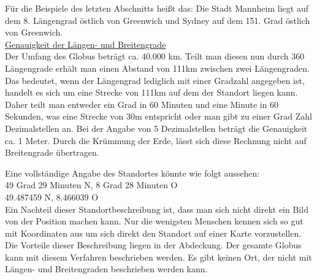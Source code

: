 Für die Beispiele des letzten Abschnitts heißt das: Die Stadt Mannheim liegt auf dem 8. Längengrad östlich von Greenwich und Sydney auf dem 151. Grad östlich von Greenwich.
\\\underline{Genauigkeit der Längen- und Breitengrade}
\\Der Umfang des Globus beträgt ca. 40.000 km. Teilt man diesen nun durch 360 Längengrade erhält man einen Abstand von 111km zwischen zwei Längengraden. Das bedeutet, wenn der Längengrad lediglich mit einer Gradzahl angegeben ist, handelt es sich um eine Strecke von 111km auf dem der Standort liegen kann. Daher teilt man entweder ein Grad in 60 Minuten und eine Minute in 60 Sekunden, was eine Strecke von 30m entspricht oder man gibt zu einer Grad Zahl Dezimalstellen an. Bei der Angabe von 5 Dezimalstellen beträgt die Genauigkeit ca. 1 Meter.
Durch die Krümmung der Erde, lässt sich diese Rechnung nicht auf Breitengrade übertragen.

Eine vollständige Angabe des Standortes könnte wie folgt aussehen:
\\49 Grad 29 Minuten N, 8 Grad 28 Minuten O  
\\49.487459 N, 8.466039 O 
\\Ein Nachteil dieser Standortbeschreibung ist, dass man sich nicht direkt ein Bild von der Position machen kann. Nur die wenigsten Menschen kennen sich so gut mit Koordinaten aus um sich direkt den Standort auf einer Karte vorzustellen.
\\Die Vorteile dieser Beschreibung liegen in der Abdeckung. Der gesamte Globus kann mit diesem Verfahren beschrieben werden. Es gibt keinen Ort, der nicht mit Längen- und Breitengraden beschrieben werden kann. 
\cite{QuelleGrade}


